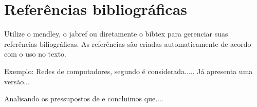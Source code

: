 \documentclass[	DIV=calc,%
							paper=a4,%
							fontsize=12pt,%
							onecolumn]{scrartcl}	 					%
\begin{document}
\section{Referências bibliográficas}
Utilize o mendley, o jabref ou diretamente o bibtex para gerenciar suas referências biliográficas. As referências são criadas automaticamente de acordo com o uso no texto.

Exemplo: Redes de computadores, segundo \cite{t2013} é considerada..... Já \cite{kurose2010} apresenta uma versão...

Analisando os pressupostos de \cite{ref3} e \cite{ref4} concluimos que....


\renewcommand\refname{} %

 
\end{document}
